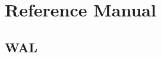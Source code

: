 \documentclass[../HDF5_RFC.tex]{subfiles}
\begin{document}
\newpage
\section{Reference Manual}

\subsection{WAL}
\end{document}
